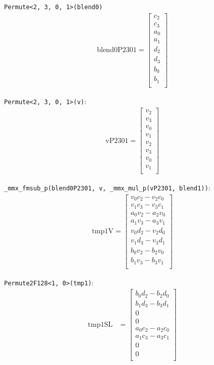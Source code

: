 \documentclass[fontsize = 10pt,DIV = 13]{scrartcl}
\begin{document}
\texttt{Permute<2, 3, 0, 1>(blend0)}
\begin{align*}
\mathrm{blend0P2301} 
=
\begin{bmatrix}
c_2\\
c_3\\
a_0\\
a_1\\
d_2\\
d_3\\
b_0\\
b_1\\
\end{bmatrix}
\end{align*}


\texttt{Permute<2, 3, 0, 1>(v)}:
\begin{align*}
\mathrm{vP2301} 
=
\begin{bmatrix}
v_2\\
v_3\\
v_0\\
v_1\\
v_2\\
v_3\\
v_0\\
v_1\\
\end{bmatrix}
\end{align*}

\texttt{_mmx_fmsub_p(blend0P2301, v, _mmx_mul_p(vP2301, blend1))}:
\begin{align*}
\mathrm{tmp1V} 
=
\begin{bmatrix}
v_0c_2 - v_2c_0\\
v_1c_3 - v_3c_1\\
a_0v_2 - a_2v_0\\
a_1v_3 - a_3v_1\\
v_0d_2 - v_2d_0\\
v_1d_3 - v_3d_1\\
b_0v_2 - b_2v_0\\
b_1v_3 - b_3v_1\\
\end{bmatrix}
\end{align*}


\texttt{Permute2F128<1, 0>(tmp1)}:
\begin{align*}
\mathrm{tmp1SL} 
&=
\begin{bmatrix}
	b_0d_2 - b_2d_0\\
	b_1d_3 - b_3d_1\\
	0\\
	0\\
	a_0c_2 - a_2c_0\\
	a_1c_3 - a_3c_1\\
	0\\
	0\\
\end{bmatrix}
\end{align*}
\end{document}
